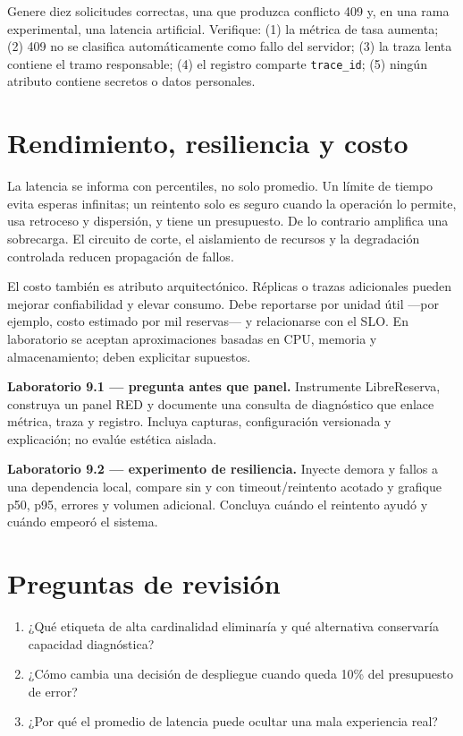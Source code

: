 \begin{validacion}
Genere diez solicitudes correctas, una que produzca conflicto 409 y, en una rama experimental, una latencia artificial. Verifique: (1) la métrica de tasa aumenta; (2) 409 no se clasifica automáticamente como fallo del servidor; (3) la traza lenta contiene el tramo responsable; (4) el registro comparte \texttt{trace\_id}; (5) ningún atributo contiene secretos o datos personales.
\end{validacion}

\section{Rendimiento, resiliencia y costo}

La latencia se informa con percentiles, no solo promedio. Un límite de tiempo evita esperas infinitas; un reintento solo es seguro cuando la operación lo permite, usa retroceso y dispersión, y tiene un presupuesto. De lo contrario amplifica una sobrecarga. El circuito de corte, el aislamiento de recursos y la degradación controlada reducen propagación de fallos.

El costo también es atributo arquitectónico. Réplicas o trazas adicionales pueden mejorar confiabilidad y elevar consumo. Debe reportarse por unidad útil ---por ejemplo, costo estimado por mil reservas--- y relacionarse con el SLO. En laboratorio se aceptan aproximaciones basadas en CPU, memoria y almacenamiento; deben explicitar supuestos.

\begin{ejercicio}
\textbf{Laboratorio 9.1 --- pregunta antes que panel.} Instrumente LibreReserva, construya un panel RED y documente una consulta de diagnóstico que enlace métrica, traza y registro. Incluya capturas, configuración versionada y explicación; no evalúe estética aislada.

\textbf{Laboratorio 9.2 --- experimento de resiliencia.} Inyecte demora y fallos a una dependencia local, compare sin y con timeout/reintento acotado y grafique p50, p95, errores y volumen adicional. Concluya cuándo el reintento ayudó y cuándo empeoró el sistema.
\end{ejercicio}

\section{Preguntas de revisión}
\begin{enumerate}
  \item ¿Qué etiqueta de alta cardinalidad eliminaría y qué alternativa conservaría capacidad diagnóstica?
  \item ¿Cómo cambia una decisión de despliegue cuando queda 10\% del presupuesto de error?
  \item ¿Por qué el promedio de latencia puede ocultar una mala experiencia real?
\end{enumerate}
